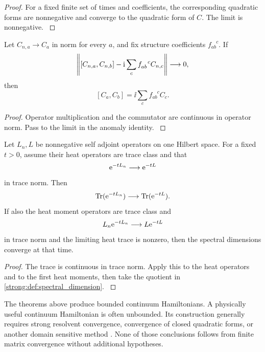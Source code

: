 \begin{proof}\label{strong:proof:077}
For a fixed finite set of times and coefficients, the corresponding quadratic forms are nonnegative and converge to the quadratic form of \(C\). The limit is nonnegative.
\label{strong:proof:077:end}\end{proof}

\begin{theorem}\label{strong:theorem:049}\label{strong:thm:constraint_limit}
Let \(C_{n,a}\to C_a\) in norm for every \(a\), and fix structure coefficients \(f_{ab}^{\phantom{ab}c}\). If
\[
\left\lVert
[C_{n,a},C_{n,b}]
-\mathrm i\sum_cf_{ab}^{\phantom{ab}c}C_{n,c}
\right\rVert
\longrightarrow0,
\]
then
\[
[C_a,C_b]
=\ii\sum_cf_{ab}^{\phantom{ab}c}C_c.
\]
\end{theorem}

\begin{proof}\label{strong:proof:078}
Operator multiplication and the commutator are continuous in operator norm. Pass to the limit in the anomaly identity.
\label{strong:proof:078:end}\end{proof}

\begin{theorem}\label{strong:theorem:050}\label{strong:thm:trace_norm_heat}
Let \(L_n,L\) be nonnegative self adjoint operators on one Hilbert space. For a fixed \(t>0\), assume their heat operators are trace class and that
\[
\mathrm e^{-tL_n}\longrightarrow\mathrm e^{-tL}
\]
in trace norm. Then
\[
\operatorname{Tr}(\mathrm e^{-tL_n})\longrightarrow\operatorname{Tr}(\mathrm e^{-tL}).
\]
If also the heat moment operators are trace class and
\[
L_n\mathrm e^{-tL_n}\longrightarrow L\mathrm e^{-tL}
\]
in trace norm and the limiting heat trace is nonzero, then the spectral dimensions converge at that time.
\end{theorem}

\begin{proof}\label{strong:proof:079}
The trace is continuous in trace norm. Apply this to the heat operators and to the first heat moments, then take the quotient in \cref{strong:def:spectral_dimension}.
\label{strong:proof:079:end}\end{proof}

\begin{remark}\label{strong:remark:003}\label{strong:rem:unbounded_limit}
The theorems above produce bounded continuum Hamiltonians. A physically useful continuum Hamiltonian is often unbounded. Its construction generally requires strong resolvent convergence, convergence of closed quadratic forms, or another domain sensitive method \cite{Kato1995,ReedSimon1972}. None of those conclusions follows from finite matrix convergence without additional hypotheses.
\end{remark}

